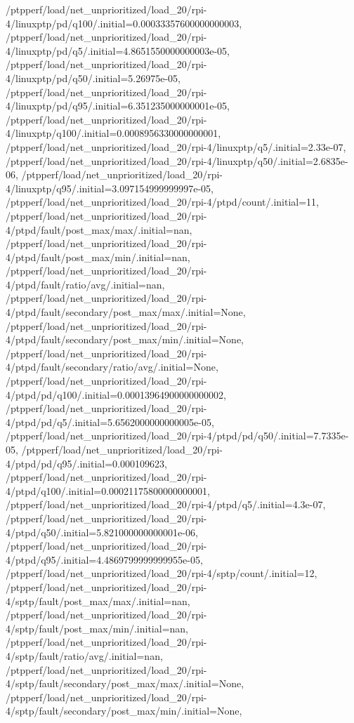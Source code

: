 {    /ptpperf/load/net_unprioritized/load_20/rpi-4/linuxptp/pd/q100/.initial=0.00033357600000000003,
    /ptpperf/load/net_unprioritized/load_20/rpi-4/linuxptp/pd/q5/.initial=4.8651550000000003e-05,
    /ptpperf/load/net_unprioritized/load_20/rpi-4/linuxptp/pd/q50/.initial=5.26975e-05,
    /ptpperf/load/net_unprioritized/load_20/rpi-4/linuxptp/pd/q95/.initial=6.351235000000001e-05,
    /ptpperf/load/net_unprioritized/load_20/rpi-4/linuxptp/q100/.initial=0.0008956330000000001,
    /ptpperf/load/net_unprioritized/load_20/rpi-4/linuxptp/q5/.initial=2.33e-07,
    /ptpperf/load/net_unprioritized/load_20/rpi-4/linuxptp/q50/.initial=2.6835e-06,
    /ptpperf/load/net_unprioritized/load_20/rpi-4/linuxptp/q95/.initial=3.097154999999997e-05,
    /ptpperf/load/net_unprioritized/load_20/rpi-4/ptpd/count/.initial=11,
    /ptpperf/load/net_unprioritized/load_20/rpi-4/ptpd/fault/post_max/max/.initial=nan,
    /ptpperf/load/net_unprioritized/load_20/rpi-4/ptpd/fault/post_max/min/.initial=nan,
    /ptpperf/load/net_unprioritized/load_20/rpi-4/ptpd/fault/ratio/avg/.initial=nan,
    /ptpperf/load/net_unprioritized/load_20/rpi-4/ptpd/fault/secondary/post_max/max/.initial=None,
    /ptpperf/load/net_unprioritized/load_20/rpi-4/ptpd/fault/secondary/post_max/min/.initial=None,
    /ptpperf/load/net_unprioritized/load_20/rpi-4/ptpd/fault/secondary/ratio/avg/.initial=None,
    /ptpperf/load/net_unprioritized/load_20/rpi-4/ptpd/pd/q100/.initial=0.00013964900000000002,
    /ptpperf/load/net_unprioritized/load_20/rpi-4/ptpd/pd/q5/.initial=5.6562000000000005e-05,
    /ptpperf/load/net_unprioritized/load_20/rpi-4/ptpd/pd/q50/.initial=7.7335e-05,
    /ptpperf/load/net_unprioritized/load_20/rpi-4/ptpd/pd/q95/.initial=0.000109623,
    /ptpperf/load/net_unprioritized/load_20/rpi-4/ptpd/q100/.initial=0.00021175800000000001,
    /ptpperf/load/net_unprioritized/load_20/rpi-4/ptpd/q5/.initial=4.3e-07,
    /ptpperf/load/net_unprioritized/load_20/rpi-4/ptpd/q50/.initial=5.821000000000001e-06,
    /ptpperf/load/net_unprioritized/load_20/rpi-4/ptpd/q95/.initial=4.4869799999999955e-05,
    /ptpperf/load/net_unprioritized/load_20/rpi-4/sptp/count/.initial=12,
    /ptpperf/load/net_unprioritized/load_20/rpi-4/sptp/fault/post_max/max/.initial=nan,
    /ptpperf/load/net_unprioritized/load_20/rpi-4/sptp/fault/post_max/min/.initial=nan,
    /ptpperf/load/net_unprioritized/load_20/rpi-4/sptp/fault/ratio/avg/.initial=nan,
    /ptpperf/load/net_unprioritized/load_20/rpi-4/sptp/fault/secondary/post_max/max/.initial=None,
    /ptpperf/load/net_unprioritized/load_20/rpi-4/sptp/fault/secondary/post_max/min/.initial=None,
}
